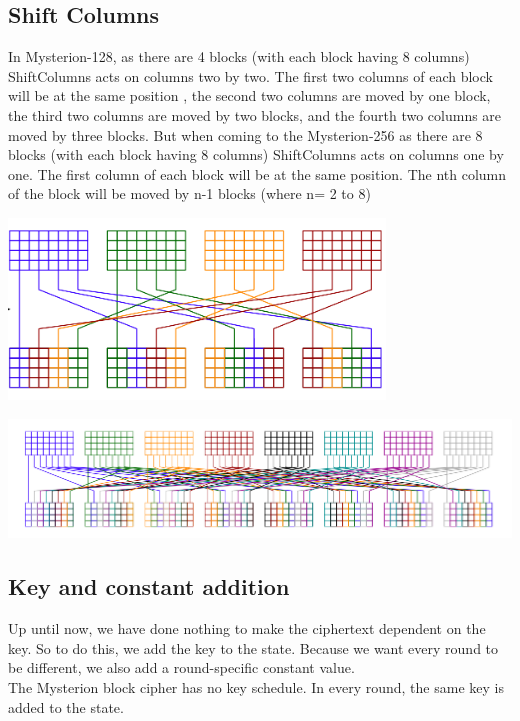 \documentclass[preprint]{transcrypto}
\begin{document}
\subsection{Shift Columns}

In Mysterion-128, as there are 4 blocks (with  each block having 8 columns)  ShiftColumns acts on columns two by two. The first two columns of each block will be at the same position , the second two columns are moved by one block, the third two columns are moved by two blocks, and the fourth two columns are moved by three blocks. But when coming to the Mysterion-256 as there are 8 blocks (with each block having 8 columns)  ShiftColumns acts on columns one by one. The first column of each block  will be at the same position. The nth column of the block will be moved by n-1 blocks (where n= 2 to 8)

\begin{center}
    \includegraphics[width=10cm]{128.png} 
\end{center}
\begin{center}
    \includegraphics[scale = 0.4]{256.png} 
\end{center}

\subsection{Key and constant addition}
Up until now, we have done nothing to make the ciphertext dependent on the key. So to do this, we add the key to the state. Because we want every round to be different, we also add a round-specific constant value.\\
The Mysterion block cipher has no key schedule. In every round, the same key is added to the state.
\end{document}
